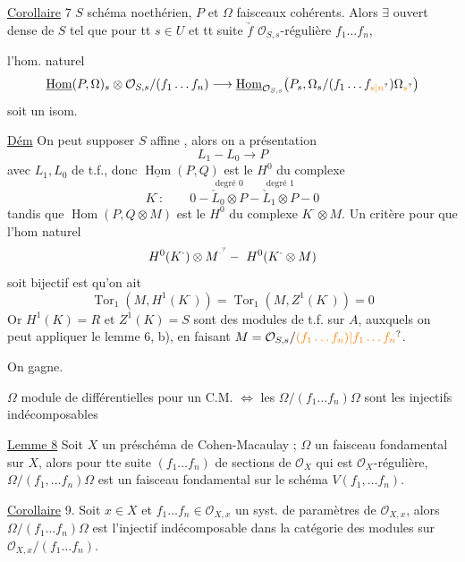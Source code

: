 \uline{Corollaire} 7 \quad $S$ schéma noethérien, $P$ et $\Omega$ faisceaux cohérents. Alors $\exists$ ouvert dense  de $S$ tel que pour tt $s\in U$ et tt suite $\underrightarrow f$ $\mathcal O_{S,s}$-régulière $f_1\ldots f_n$,

l'hom. naturel
\[
\underline{\operatorname{Hom}}(P,\Omega)_s\otimes\mathcal O_{S,s}/(f_1\ldots f_n)\longrightarrow
\underline{\operatorname{Hom}}_{\mathcal O_{S,s}}\bigl(P_s,\Omega_s/(f_1\ldots f_{\unsure{s|n}})\Omega_{\unsure{s}}\bigr)
\]
soit un isom.

\uline{Dém} On peut supposer $S$ affine , alors on a  présentation
\[
L_1\mathbin{-}L_0\longrightarrow P
\]
avec $L_1,L_0$  de t.f., donc $\underline{\operatorname{Hom}}(P,Q)$ est le $H^0$ du complexe
\[
K^{\cdot}:\qquad 0-\overset{\text{degré }0}{\check L_0\otimes P}-\overset{\text{degré }1}{\check L_1\otimes P}-0
\]
tandis que $\operatorname{Hom}(P,Q\otimes M)$ est le $H^0$ du complexe $K^{\cdot}\otimes M$. Un critère pour que l'hom naturel
\[
H^0(K^{\cdot})\otimes M^{\unsure{\cdot}}-\ H^0(K^{\cdot}\otimes M)
\]
soit bijectif est qu'on ait
\[
\operatorname{Tor}_1(M,H^1(K^{\cdot}))=\operatorname{Tor}_1(M,Z^1(K^{\cdot}))=0
\]
Or $H^1(K)=R$ et $Z^1(K)=S$ sont des modules de t.f. sur $A$, auxquels on peut appliquer le  lemme 6, b), en faisant $M=\mathcal O_{S,s}/\unsure{(f_1\ldots f_n)|f_1\ldots f_n}$.

On gagne.

$\Omega$ module de différentielles pour un C.M. $\Longleftrightarrow$ les $\Omega/(f_1\ldots f_n)\Omega$ sont les injectifs indécomposables

 

\uline{Lemme 8} Soit $X$ un préschéma de Cohen-Macaulay ;  $\Omega$ un faisceau fondamental sur $X$, alors pour tte suite $(f_1\ldots f_n)$ de sections de $\mathcal O_X$ qui est $\mathcal O_X$-régulière, $\Omega/(f_1,\ldots f_n)\Omega$ est un faisceau fondamental sur le schéma    $V(f_1,\ldots f_n)$.

\uline{Corollaire} 9. Soit $x\in X$ et $f_1\ldots f_n\in\mathcal O_{X,x}$ un syst. de paramètres de $\mathcal O_{X,x}$, alors  $\Omega/(f_1\ldots f_n)\Omega$ est  l'injectif indécomposable dans la catégorie des modules sur $\mathcal O_{X,x}/(f_1\ldots f_n)$.

